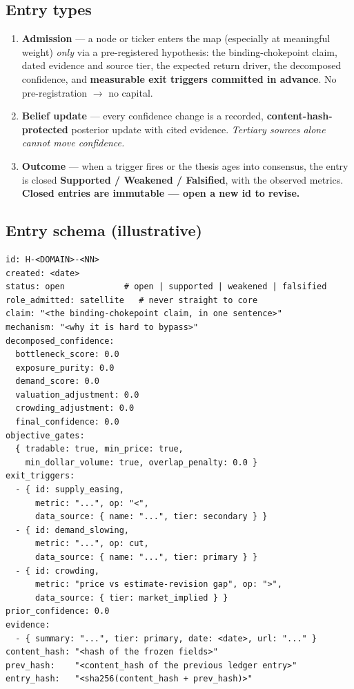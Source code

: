 \documentclass[11pt]{article}
\begin{document}
\subsection*{Entry types}

\begin{enumerate}
  \item \textbf{Admission} --- a node or ticker enters the map (especially at meaningful weight)
    \emph{only} via a pre-registered hypothesis: the binding-chokepoint claim, dated evidence and
    source tier, the expected return driver, the decomposed confidence, and \textbf{measurable exit
    triggers committed in advance}. No pre-registration $\rightarrow$ no capital.
  \item \textbf{Belief update} --- every confidence change is a recorded,
    \textbf{content-hash-protected} posterior update with cited evidence. \emph{Tertiary sources
    alone cannot move confidence.}
  \item \textbf{Outcome} --- when a trigger fires or the thesis ages into consensus, the entry is
    closed \textbf{Supported / Weakened / Falsified}, with the observed metrics. \textbf{Closed
    entries are immutable --- open a new id to revise.}
\end{enumerate}

\subsection*{Entry schema (illustrative)}

\noindent\begin{minipage}{\linewidth}\footnotesize
\begin{verbatim}
id: H-<DOMAIN>-<NN>
created: <date>
status: open            # open | supported | weakened | falsified
role_admitted: satellite   # never straight to core
claim: "<the binding-chokepoint claim, in one sentence>"
mechanism: "<why it is hard to bypass>"
decomposed_confidence:
  bottleneck_score: 0.0
  exposure_purity: 0.0
  demand_score: 0.0
  valuation_adjustment: 0.0
  crowding_adjustment: 0.0
  final_confidence: 0.0
objective_gates:
  { tradable: true, min_price: true,
    min_dollar_volume: true, overlap_penalty: 0.0 }
exit_triggers:
  - { id: supply_easing,
      metric: "...", op: "<",
      data_source: { name: "...", tier: secondary } }
  - { id: demand_slowing,
      metric: "...", op: cut,
      data_source: { name: "...", tier: primary } }
  - { id: crowding,
      metric: "price vs estimate-revision gap", op: ">",
      data_source: { tier: market_implied } }
prior_confidence: 0.0
evidence:
  - { summary: "...", tier: primary, date: <date>, url: "..." }
content_hash: "<hash of the frozen fields>"
prev_hash:    "<content_hash of the previous ledger entry>"
entry_hash:   "<sha256(content_hash + prev_hash)>"
\end{verbatim}
\end{minipage}
\end{document}

